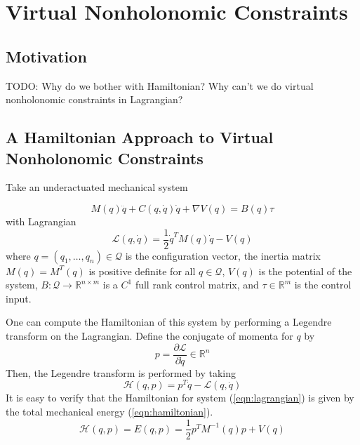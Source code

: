 
\section{Virtual Nonholonomic Constraints}\label{sec:vnhcs}

\subsection{Motivation}
TODO: Why do we bother with Hamiltonian? Why can't we do virtual nonholonomic constraints in Lagrangian?

\subsection{A Hamiltonian Approach to Virtual Nonholonomic Constraints}
Take an underactuated mechanical system 

\begin{equation}\label{eqn:eom_lagrangian}
M(q)\ddot{q} + C(q,\dot{q})\dot{q} + \nabla V(q) = B(q)\tau
\end{equation}
with Lagrangian
\begin{equation}\label{eqn:lagrangian}
\mathcal{L}(q,\dot{q}) = \frac{1}{2} \dot{q}^T M(q) \dot{q} - V(q)
\end{equation}
where \(q = (q_1,\ldots,q_n) \in \mathcal{Q}\) is the configuration vector, the inertia matrix \(M(q) = M^T(q)\) is positive definite for all \(q \in \mathcal{Q}\), \(V(q)\) is the potential of the system, \(B : \mathcal{Q} \rightarrow \mathbb{R}^{n \times m}\) is a \(C^1\) full rank control matrix, and \(\tau \in \mathbb{R}^{m}\) is the control input.

One can compute the Hamiltonian of this system by performing a Legendre transform on the Lagrangian. Define the conjugate of momenta for \(q\) by 
\[
p = \frac{\partial \mathcal{L}}{\partial \dot{q}} \in \mathbb{R}^n
\]
Then, the Legendre transform is performed by taking
\[
\mathcal{H}(q,p) = p^T \dot{q} - \mathcal{L}(q,\dot{q})
\]
It is easy to verify that the Hamiltonian for system (\ref{eqn:lagrangian}) is given by the total mechanical energy (\ref{eqn:hamiltonian}).
\begin{equation}\label{eqn:hamiltonian}
\mathcal{H}(q,p) = E(q,p) = \frac{1}{2} p^T M^{-1}(q) p + V(q)
\end{equation}

